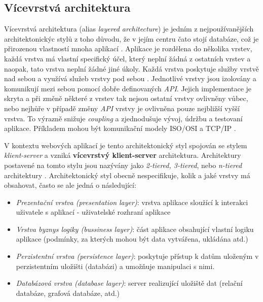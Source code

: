 

\subsection{Vícevrstvá architektura}
\label{sec:n-tier}
Vícevrstvá architektura (alias \textit{layered architecture}) je jedním z nejpoužívanějších architektonickýc stylů z toho důvodu, že v jejím centru čato stojí databáze, což je přirozenou vlastností mnoha aplikací \cite{Richards15}. Aplikace je rozdělena do několika vrstev, každá vrstva má vlastní specifický účel, který neplní žádná z ostatních vrstev a naopak, tato vrstva neplní žádné jiné úkoly. Každá vrstva poskytuje služby vrstvě nad sebou a využívá služeb vrstvy pod sebou \cite{Garlan94}. Jednotlivé vrstvy jsou izolovány a komunikují mezi sebou pomocí dobře definovaných \textit{API}. Jejich implementace je skryta a při změně některé z vrstev tak nejsou ostatní vrstvy ovlivněny vůbec, nebo nejhůře v případě změny \textit{API} vrstvy je ovlivněna pouze nejbližší vyšší vrstva. To výrazně snižuje \textit{coupling} a zjednodušuje vývoj, údržbu a testovaní aplikace. Příkladem mohou být komunikační modely ISO/OSI a TCP/IP \cite{Zimmerman80}. 

V kontextu webových aplikací je tento architektonický styl spojován se stylem \textit{klient-server} a vzniká \textbf{vícevrstvý klient-server} architektura. Architektury postavené na tomto stylu jsou nazývány jako \textit{2-tiered, 3-tiered}, nebo \textit{n-tiered} architektury \cite{Umar97}. Architektonický styl obecně nespecifikuje, kolik a jaké vrstvy má obsahovat, často se ale jedná o následující: 

\begin{itemize}
  \item{\textit{Prezentační vrstva (presentation layer)}}: vrstva aplikace sloužící k interakci uživatele s aplikací - uživatelské rozhraní aplikace 
  \item{\textit{Vrstva byznys logiky (bussiness layer)}}: část aplikace obsahující vlastní logiku aplikace (podmínky, za kterých mohou být data vytvářena, ukládána atd.)
  \item{\textit{Perzistentní vrstva (persistence layer)}}: poskytuje přístup k datům uloženým v perzistentním uložišti (databázi) a umožňuje manipulaci s nimi. 
  \item{\textit{Databázová vrstva (database layer)}}: server realizující uložiště dat (relační databáze, grafová databáze, atd.) 
\end{itemize}

